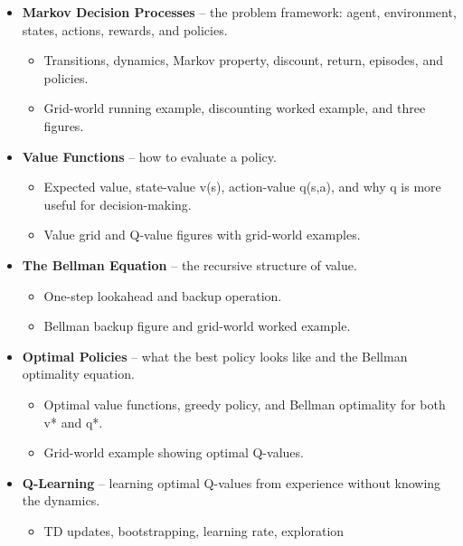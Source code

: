 \documentclass[11pt]{article}
\begin{document}
\begin{itemize}
\item \textbf{Markov Decision Processes} -- the problem framework:
  agent, environment, states, actions, rewards, and policies.
  \begin{itemize}[label=$\circ$, itemsep=0.2em, parsep=0pt, topsep=0pt, partopsep=0pt]
  \item Transitions, dynamics, Markov property, discount,
    return, episodes, and policies.
  \item Grid-world running example, discounting worked example,
    and three figures.
  \end{itemize}
\item \textbf{Value Functions} -- how to evaluate a policy.
  \begin{itemize}[label=$\circ$, itemsep=0.2em, parsep=0pt, topsep=0pt, partopsep=0pt]
  \item Expected value, state-value v(s), action-value q(s,a),
    and why q is more useful for decision-making.
  \item Value grid and Q-value figures with grid-world examples.
  \end{itemize}
\item \textbf{The Bellman Equation} -- the recursive structure
  of value.
  \begin{itemize}[label=$\circ$, itemsep=0.2em, parsep=0pt, topsep=0pt, partopsep=0pt]
  \item One-step lookahead and backup operation.
  \item Bellman backup figure and grid-world worked example.
  \end{itemize}
\item \textbf{Optimal Policies} -- what the best policy looks
  like and the Bellman optimality equation.
  \begin{itemize}[label=$\circ$, itemsep=0.2em, parsep=0pt, topsep=0pt, partopsep=0pt]
  \item Optimal value functions, greedy policy, and Bellman
    optimality for both v* and q*.
  \item Grid-world example showing optimal Q-values.
  \end{itemize}
\item \textbf{Q-Learning} -- learning optimal Q-values from
  experience without knowing the dynamics.
  \begin{itemize}[label=$\circ$, itemsep=0.2em, parsep=0pt, topsep=0pt, partopsep=0pt]
  \item TD updates, bootstrapping, learning rate, exploration

\end{itemize}
\end{itemize}
\end{document}
